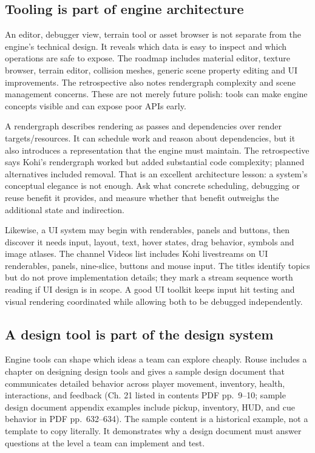 \subsection{Tooling is part of engine architecture}\label{06-engine-ii-ch032-tooling-is-part-of-engine-architecture}

An editor, debugger view, terrain tool or asset browser is not separate from the engine's technical design. It reveals which data is easy to inspect and which operations are safe to expose. The roadmap includes material editor, texture browser, terrain editor, collision meshes, generic scene property editing and UI improvements. The retrospective also notes rendergraph complexity and scene management concerns. These are not merely future polish: tools can make engine concepts visible and can expose poor APIs early.

A rendergraph describes rendering as passes and dependencies over render targets/resources. It can schedule work and reason about dependencies, but it also introduces a representation that the engine must maintain. The retrospective says Kohi's rendergraph worked but added substantial code complexity; planned alternatives included removal. That is an excellent architecture lesson: a system's conceptual elegance is not enough. Ask what concrete scheduling, debugging or reuse benefit it provides, and measure whether that benefit outweighs the additional state and indirection.

Likewise, a UI system may begin with renderables, panels and buttons, then discover it needs input, layout, text, hover states, drag behavior, symbols and image atlases. The channel Videos list includes Kohi livestreams on UI renderables, panels, nine-slice, buttons and mouse input. The titles identify topics but do not prove implementation details; they mark a stream sequence worth reading if UI design is in scope. A good UI toolkit keeps input hit testing and visual rendering coordinated while allowing both to be debugged independently.

\subsection{A design tool is part of the design system}\label{06-engine-ii-ch032-a-design-tool-is-part-of-the-design-system}

Engine tools can shape which ideas a team can explore cheaply. Rouse includes a chapter on designing design tools and gives a sample design document that communicates detailed behavior across player movement, inventory, health, interactions, and feedback (Ch. 21 listed in contents PDF pp.~9--10; sample design document appendix examples include pickup, inventory, HUD, and cue behavior in PDF pp.~632--634). The sample content is a historical example, not a template to copy literally. It demonstrates why a design document must answer questions at the level a team can implement and test.


